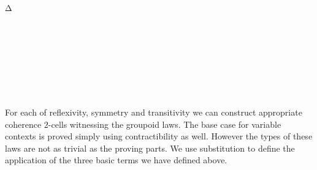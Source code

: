 \begin{code}\>\<%
\\
\> \<[11]%
\>[11]\AgdaSymbol{:} \AgdaSymbol{\{} \AgdaSymbol{:} \AgdaSymbol{\}(} \AgdaSymbol{:}  \AgdaSymbol{)} \<[33]%
\>[33]\<%
\\
\>[9]\<[11]%
\>[11]  \AgdaSymbol{(} \AgdaSymbol{\{}Δ \AgdaSymbol{=} \AgdaSymbol{\}}  \AgdaSymbol{(}    \AgdaSymbol{))}\<%
\\
\>  \<[11]%
\>[11]\AgdaSymbol{=}   \<%
\\
%
\\
\> \<[10]%
\>[10]\AgdaSymbol{:}  \AgdaSymbol{\{}\AgdaSymbol{\}(} \AgdaSymbol{:}  \AgdaSymbol{)}   \AgdaSymbol{(}  \AgdaSymbol{)}\<%
\\
\>  \<[10]%
\>[10]\AgdaSymbol{=}   \<%
\\
%
\\
\> \<[12]%
\>[12]\AgdaSymbol{:}  \AgdaSymbol{\{}\AgdaSymbol{\}(} \AgdaSymbol{:}  \AgdaSymbol{)}   \AgdaSymbol{(}  \AgdaSymbol{)}\<%
\\
\>  \<[12]%
\>[12]\AgdaSymbol{=}   \<%
\\
\>\<\end{code}
For each of reflexivity, symmetry and transitivity we can construct appropriate coherence $2$-cells witnessing the groupoid laws. The base case for variable contexts is proved simply using contractibility as well. However the types of these laws are not as trivial as the proving parts. We use substitution to define the application of the three basic terms we have defined above.

